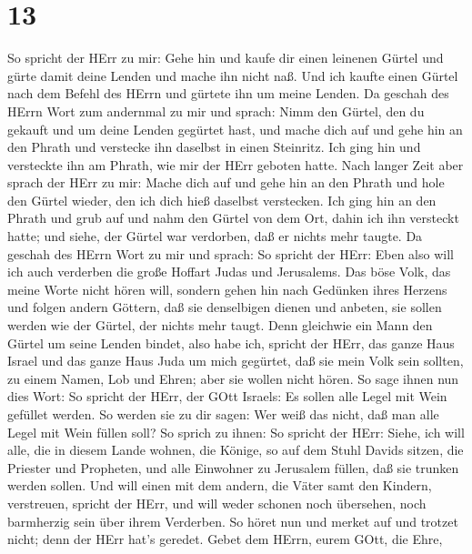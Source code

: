 \hypertarget{section-12}{%
\section{13}\label{section-12}}

 So spricht der HErr zu mir: Gehe hin und kaufe dir einen
leinenen Gürtel und gürte damit deine Lenden und mache ihn nicht naß.
 Und ich kaufte einen Gürtel nach dem Befehl des HErrn und
gürtete ihn um meine Lenden.  Da geschah des HErrn Wort zum
andernmal zu mir und sprach:  Nimm den Gürtel, den du
gekauft und um deine Lenden gegürtet hast, und mache dich auf und gehe
hin an den Phrath und verstecke ihn daselbst in einen Steinritz.
 Ich ging hin und versteckte ihn am Phrath, wie mir der HErr
geboten hatte.  Nach langer Zeit aber sprach der HErr zu
mir: Mache dich auf und gehe hin an den Phrath und hole den Gürtel
wieder, den ich dich hieß daselbst verstecken.  Ich ging hin
an den Phrath und grub auf und nahm den Gürtel von dem Ort, dahin ich
ihn versteckt hatte; und siehe, der Gürtel war verdorben, daß er nichts
mehr taugte.  Da geschah des HErrn Wort zu mir und sprach:
 So spricht der HErr: Eben also will ich auch verderben die
große Hoffart Judas und Jerusalems.  Das böse Volk, das
meine Worte nicht hören will, sondern gehen hin nach Gedünken ihres
Herzens und folgen andern Göttern, daß sie denselbigen dienen und
anbeten, sie sollen werden wie der Gürtel, der nichts mehr taugt.
 Denn gleichwie ein Mann den Gürtel um seine Lenden bindet,
also habe ich, spricht der HErr, das ganze Haus Israel und das ganze
Haus Juda um mich gegürtet, daß sie mein Volk sein sollten, zu einem
Namen, Lob und Ehren; aber sie wollen nicht hören.  So sage
ihnen nun dies Wort: So spricht der HErr, der GOtt Israels: Es sollen
alle Legel mit Wein gefüllet werden. So werden sie zu dir sagen: Wer
weiß das nicht, daß man alle Legel mit Wein füllen soll? 
So sprich zu ihnen: So spricht der HErr: Siehe, ich will alle, die in
diesem Lande wohnen, die Könige, so auf dem Stuhl Davids sitzen, die
Priester und Propheten, und alle Einwohner zu Jerusalem füllen, daß sie
trunken werden sollen.  Und will einen mit dem andern, die
Väter samt den Kindern, verstreuen, spricht der HErr, und will weder
schonen noch übersehen, noch barmherzig sein über ihrem Verderben.
 So höret nun und merket auf und trotzet nicht; denn der
HErr hat's geredet.  Gebet dem HErrn, eurem GOtt, die Ehre,
